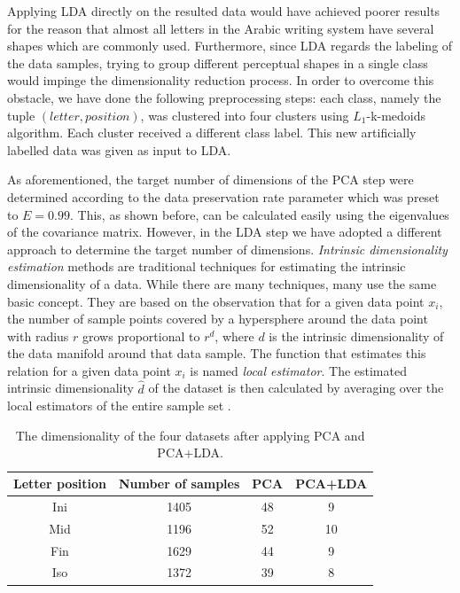 \iftoggle{edit-mode}{\hspace{0pt}\marginpar{Implementation: Clustering and LDA}}{}
Applying LDA directly on the resulted data would have achieved poorer results for the reason that almost all letters in the Arabic writing system have several shapes which are commonly used. Furthermore, since LDA regards the labeling of the data samples, trying to group different perceptual shapes in a single class would impinge the dimensionality reduction process. 
In order to overcome this obstacle, we have done the following preprocessing steps: each class, namely the tuple $(letter, position)$, was clustered into four clusters using $L_1$-k-medoids algorithm. Each cluster received a different class label. This new artificially labelled data was given as input to LDA.

\iftoggle{edit-mode}{\hspace{0pt}\marginpar{LDA target dimensionality}}{}
As aforementioned, the target number of dimensions of the PCA step were determined according to the data preservation rate parameter which was preset to $E=0.99$. This, as shown before, can be calculated easily using the eigenvalues of the covariance matrix. However, in the LDA step we have adopted a different approach to determine the target number of dimensions. \emph{Intrinsic dimensionality estimation} methods are traditional techniques for estimating the intrinsic dimensionality of a data. While there are many techniques, many use the same basic concept. They are based on the observation that for a given data point $x_i$, the number of sample points covered by a hypersphere around the data point with radius $r$ grows proportional to $r^d$, where $d$ is the intrinsic dimensionality of the data manifold around that data sample.  
The function that estimates this relation for a given data point $x_i$ is named \emph{local estimator}.
The estimated intrinsic dimensionality $\hat{d}$ of the dataset is then calculated by averaging over the local estimators of the entire sample set \cite{van2007introduction}.

\begin{table}
\centering
\begin{tabular}{ | c | c | c | c |}
\hline
Letter position & Number of samples & PCA & PCA+LDA\\
\hline                 
  Ini & 1405 & 48 & 9 \\ 
  \hline
  Mid & 1196 & 52 & 10 \\ 
  \hline
  Fin & 1629 & 44 & 9 \\ 
  \hline
  Iso & 1372 & 39 & 8 \\ 
  \hline
\end{tabular}
\caption{The dimensionality of the four datasets after applying PCA and PCA+LDA.}
\label{table:dr_dimensions_results} 
\end{table}

